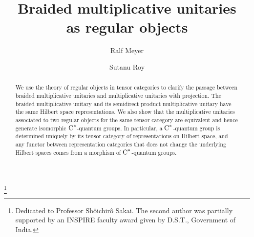 \documentclass[a4paper]{amsart}
\numberwithin{equation}{section}
\theoremstyle{plain}
\numberwithin{theorem}{section}
\theoremstyle{definition}
\theoremstyle{remark}
\newcommand*{\nb}{\nobreakdash}
\newcommand*{\Cst}{\textup C^*}%
\begin{document}
\title[Braided multiplicative unitaries as regular objects]
{Braided multiplicative unitaries\\ as regular objects}

\author{Ralf Meyer}
\address{Mathematisches Institut\\
  Georg-August Universität Göttingen\\
  Bunsenstraße 3--5\\
  37073 Göttingen\\
  Germany}

\author{Sutanu Roy}
\address{School of Mathematical Sciences\\
 National Institute of Science Education and Research  Bhubaneswar, HBNI\\
 Jatni, 752050\\
 India}

\begin{abstract}
  We use the theory of regular objects in tensor categories to clarify
  the passage between braided multiplicative unitaries and
  multiplicative unitaries with projection.  The braided
  multiplicative unitary and its semidirect product multiplicative
  unitary have the same Hilbert space representations.
  We also show that the
  multiplicative unitaries associated to two regular objects for the
  same tensor category are equivalent and hence generate isomorphic
  \(\Cst\)\nb-quantum groups.  In particular, a \(\Cst\)\nb-quantum
  group is determined uniquely by its tensor category of
  representations on Hilbert space, and any functor between
  representation categories that does not change the underlying
  Hilbert spaces comes from a morphism of \(\Cst\)\nb-quantum
  groups.
\end{abstract}



\thanks{Dedicated to Professor Sh\^oichir\^o Sakai.  The second author
  was partially supported by an INSPIRE faculty award given by D.S.T.,
  Government of India.}

\maketitle
\end{document}
